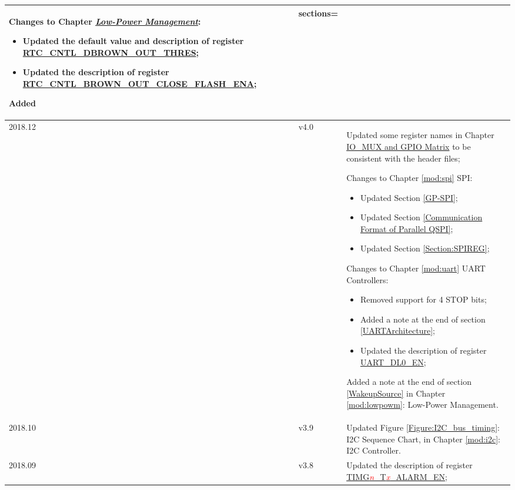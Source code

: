 \begin{longtable}[l]{ | m{2cm} | m{1.5cm} | m{12cm} | }
Changes to Chapter \hyperref[mod:lowpowm]{\it{Low-Power Management}}:
\begin{itemize}
\item Updated the default value and description of register \hyperref[RTCCNTLDBROWNOUTTHRES]{RTC\_CNTL\_DBROWN\_OUT\_THRES};
\item Updated the description of register \hyperref[RTCCNTLBROWNOUTCLOSEFLASHENA]{RTC\_CNTL\_BROWN\_OUT\_CLOSE\_FLASH\_ENA};
\end{itemize}

Added \href{https://www.espressif.com/en/company/contact/documentation_feedback?docId=3642&sections=}{documentation feedback hyperlink}.
\\\hline

2018.12&v4.0&Updated some register names in Chapter \hyperref[mod:iomuxgpio]{IO\_MUX and GPIO Matrix} to be consistent with the header files;

Changes to Chapter \ref{mod:spi} SPI:
\begin{itemize}
\item Updated Section \ref{GP-SPI};
\item Updated Section \ref{Communication Format of Parallel QSPI};
\item Updated Section \ref{Section:SPIREG};
\end{itemize}

Changes to Chapter \ref{mod:uart} UART Controllers:
\begin{itemize}
    \item Removed support for 4 STOP bits;
    \item Added a note at the end of section \ref{UARTArchitecture};
    \item Updated the description of register \hyperref[UARTDL0EN]{UART\_DL0\_EN};
\end{itemize}

Added a note at the end of section \ref{WakeupSource} in Chapter \ref{mod:lowpowm}: Low-Power Management.
\\\hline
2018.10&v3.9&Updated Figure \ref{Figure:I2C_bus_timing}: I2C Sequence Chart, in Chapter \ref{mod:i2c}: I2C Controller.\\\hline
2018.09&v3.8&Updated the description of register \hyperref[TIMGnTxALARMEN]{TIMG\textcolor{red}{\it{n}}\_T\textcolor{red}{\it{x}}\_ALARM\_EN};


\end{longtable}
